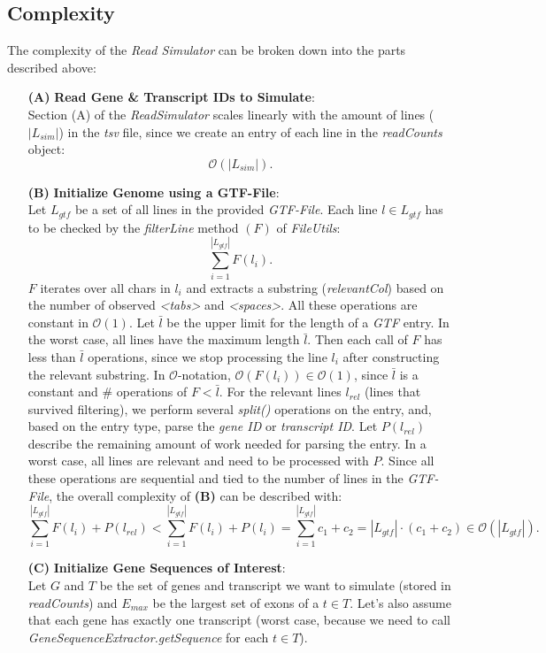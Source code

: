 \documentclass[12pt]{article}
\begin{document}
\subsection{Complexity}
The complexity of the \textit{Read Simulator} can be broken down into the parts described above:
\begin{enumerate}
	\item[\textbf{(A)}] \textbf{Read Gene \& Transcript IDs to Simulate}:\\
		Section (A) of the \textit{ReadSimulator} scales linearly with the amount of lines ($|L_{sim}|$) in the \textit{tsv} file, since
		we create an entry of each line in the \textit{readCounts} object:
		\[
			\mathcal{O}(|L_{sim}|)
			.\]
	\item[\textbf{(B)}] \textbf{Initialize Genome using a GTF-File}:\\
		Let $L_{gtf}$ be a set of all lines in the provided \textit{GTF-File}.
		Each line $l \in L_{gtf}$ has to be checked by the \textit{filterLine} method $(F)$ of \textit{FileUtils}:
		\[
			\sum_{i=1}^{|L_{gtf}|} F(l_{i})
			.\]
		$F$ iterates over all chars in $l_{i}$ and extracts a substring (\textit{relevantCol}) based on the number
		of observed \textit{<tabs>} and \textit{<spaces>}. All these operations are constant in $\mathcal{O}(1)$.
		Let $\bar{l}$ be the upper limit for the length of a \textit{GTF} entry. In the worst case, all lines
		have the maximum length $\bar{l}$. Then each call of $F$ has less than $\bar{l}$ operations, since we
		stop processing the line $l_{i}$ after constructing the relevant substring. In $\mathcal{O}$-notation,
		$\mathcal{O}(F(l_{i})) \in \mathcal{O}(1)$, since $\bar{l}$ is a constant and $\#$ operations of $F < \bar{l}$.
		For the relevant lines $l_{rel}$ (lines that survived filtering), we perform several
		\textit{split()} operations on the entry, and, based on the entry type, parse the \textit{gene ID}
		or \textit{transcript ID}. Let $P(l_{rel})$ describe the remaining amount of work needed
		for parsing the entry. In a worst case, all lines are relevant and need to be processed with $P$.
		Since all these operations are sequential and tied to the number of lines in the \textit{GTF-File}, the overall complexity of \textbf{(B)} can be
		described with:
		\[
			\sum_{i=1}^{|L_{gtf}|} F(l_{i}) + P(l_{rel}) < \sum_{i=1}^{|L_{gtf}|} F(l_{i}) + P(l_{i}) = \sum_{i=1}^{|L_{gtf}|} c_{1} + c_{2} = |L_{gtf}| \cdot (c_{1} + c_{2}) \in \mathcal{O}(|L_{gtf}|)
			.\]
		\newpage
	\item[\textbf{(C)}] \textbf{Initialize Gene Sequences of Interest}:\label{initTargetSequences}\\
		Let $G$ and $T$ be the set of genes and transcript we want to simulate (stored in \textit{readCounts}) and $E_{max}$ be the largest set of exons of a $t \in T$.
		Let's also assume that each gene has exactly one transcript (worst case, because we need to call \textit{GeneSequenceExtractor.getSequence} for each $t \in T$).


\end{enumerate}
\end{document}

